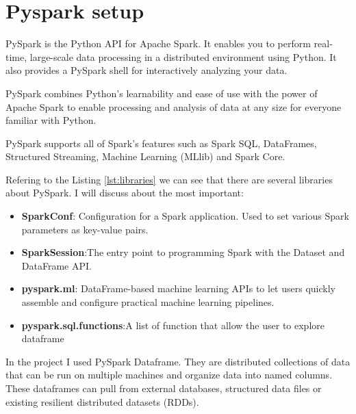 \documentclass[12pt,english]{report}
\begin{document}
\section{Pyspark setup}
PySpark is the Python API for Apache Spark. It enables you to perform real-time, large-scale data processing in a distributed environment using Python. It also provides a PySpark shell for interactively analyzing your data. \par
PySpark combines Python’s learnability and ease of use with the power of Apache Spark to enable processing and analysis of data at any size for everyone familiar with Python.\par
PySpark supports all of Spark’s features such as Spark SQL, DataFrames, Structured Streaming, Machine Learning (MLlib) and Spark Core. \cite{pysparkoverview} \par
Refering to the Listing \ref{lst:libraries} we can see that there are several libraries about PySpark. I will discuss about the most important:
\begin{itemize}
\item \textbf{SparkConf}: Configuration for a Spark application. Used to set various Spark parameters as key-value pairs. \cite{sparkconf}
\item \textbf{SparkSession}:The entry point to programming Spark with the Dataset and DataFrame API. \cite{sparksession}
\item \textbf{pyspark.ml}: DataFrame-based machine learning APIs to let users quickly assemble and configure practical machine learning pipelines. \cite{pysparkml}
\item \textbf{pyspark.sql.functions}:A list of function that allow the user to explore dataframe \cite{pysparkfunc} 
\end{itemize}
In the project I used PySpark Dataframe. They are distributed collections of data that can be run on multiple machines and organize data into named columns. These dataframes can pull from external databases, structured data files or existing resilient distributed datasets (RDDs).
\end{document}

